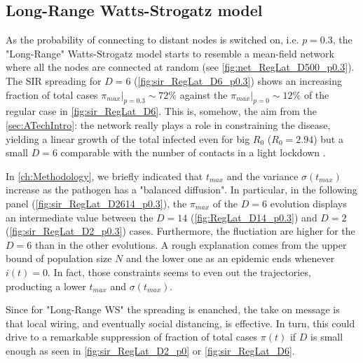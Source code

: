 \documentclass[a4paper,10pt,twoside]{book} %
\theoremstyle{definition}
\begin{document}
\clearpage
\subsection{Long-Range Watts-Strogatz model}
\label{sec:res_RegLat_p0.3}
As the probability of connecting to distant nodes is switched on, i.e. $p = 0.3$, the "Long-Range" Watts-Strogatz model starts to resemble a mean-field network where all the nodes are connected at random (see \autoref{fig:net_RegLat_D500_p0.3}). The SIR spreading for $ D = 6$ (\autoref{fig:sir_RegLat_D6_p0.3}) shows an increasing fraction of total cases $\pi_{max}|_{p=0.3} \sim 72\%$ against the $\pi_{max}|_{p=0} \sim 12\%$ of the regular case in \autoref{fig:sir_RegLat_D6}. This is, somehow, the aim from the \autoref{sec:ATechIntro}: the network really plays a role in constraining the disease, yielding a linear growth of the total infected even for big $R_0$ ($R_0 = 2.94$) but a small $ D=6$ comparable with the number of contacts in a light lockdown \cite{Liu::2021_Review_SContactPattern}.

In \autoref{ch:Methodology}, we briefly indicated that $t_{max}$ and the variance $ \sigma(t_{max})$ increase as the pathogen has a "balanced diffusion". In particular, in the following panel (\autoref{fig:sir_RegLat_D2614_p0.3}), the $ \pi_{max}$ of the $ D = 6$ evolution displays an intermediate value between the $ D = 14$ (\autoref{fig:RegLat_D14_p0.3}) and $ D = 2$ (\autoref{fig:sir_RegLat_D2_p0.3}) cases. Furthermore, the fluctiation are higher for the $ D =6$ than in the other evolutions. A rough explanation comes from the upper bound of population size $N$ and the lower one as an epidemic ends whenever $ i(t) = 0$. In fact, those constraints seems to even out the trajectories, producting a lower $t_{max}$ and $ \sigma(t_{max})$.

Since for "Long-Range WS" the spreading is enanched, the take on message is that local wiring, and eventually social distancing, is effective. In turn, this could drive to a remarkable suppression of fraction of total cases $ \pi(t)$ if $ D$ is small enough as seen in \autoref{fig:sir_RegLat_D2_p0} or \autoref{fig:sir_RegLat_D6}.
\end{document}

